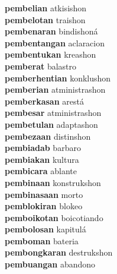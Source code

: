\textbf{pembelian } atkisishon \\
\textbf{pembelotan } traishon \\
\textbf{pembenaran } bindishoná \\
\textbf{pembentangan } aclaracion \\
\textbf{pembentukan } kreashon \\
\textbf{pemberat } balastro \\
\textbf{pemberhentian } konklushon \\
\textbf{pemberian } atministrashon \\
\textbf{pemberkasan } arestá \\
\textbf{pembesar } atministrashon \\
\textbf{pembetulan } adaptashon \\
\textbf{pembezaan } distinshon \\
\textbf{pembiadab } barbaro \\
\textbf{pembiakan } kultura \\
\textbf{pembicara } ablante \\
\textbf{pembinaan } konstrukshon \\
\textbf{pembinasaan } morto \\
\textbf{pemblokiran } blokeo \\
\textbf{pemboikotan } boicotiando \\
\textbf{pembolosan } kapitulá \\
\textbf{pemboman } bateria \\
\textbf{pembongkaran } destrukshon \\
\textbf{pembuangan } abandono \\
